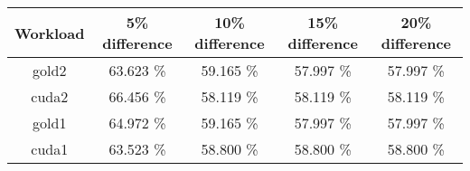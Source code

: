 \begin{tabular}{|c|c|c|c|c|}
\hline
  \textbf{Workload} & \textbf{5\% difference} & \textbf{10\% difference} & \textbf{15\% difference} & \textbf{20\% difference}\\
\hline
\hline
  gold2 & 63.623 \% & 59.165 \% & 57.997 \% & 57.997 \%\\
  cuda2 & 66.456 \% & 58.119 \% & 58.119 \% & 58.119 \%\\
  gold1 & 64.972 \% & 59.165 \% & 57.997 \% & 57.997 \%\\
  cuda1 & 63.523 \% & 58.800 \% & 58.800 \% & 58.800 \%\\
\hline
\end{tabular}
